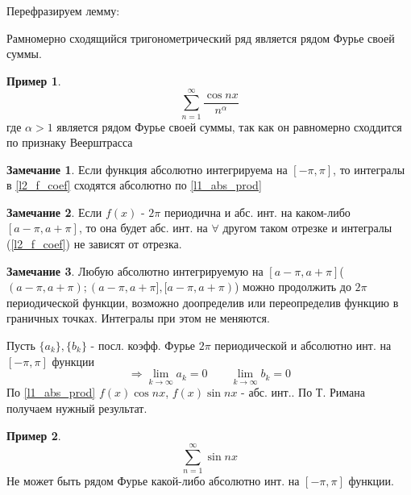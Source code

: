\documentclass{article}
\theoremstyle{definition}
\numberwithin{theorem}{section}
\numberwithin{lemma}{section}
\numberwithin{definition}{section}
\numberwithin{corollary}{section}
\newtheorem*{eg}{Пример}
\newtheorem*{remark}{Замечание}
\numberwithin{equation}{section}
\let\implies\Rightarrow
\begin{document}
Перефразируем лемму:
\begin{lemma}
  Рамномерно сходящийся тригонометрический ряд является рядом Фурье своей суммы. 
\end{lemma}
\begin{eg}
  \[
    \sum_{n=1}^{\infty}\frac{\cos nx}{n^{\alpha}}
  \]
  где $\alpha>1$ является рядом Фурье своей суммы, так  как он
  равномерно сходдится по признаку Веерштрасса
\end{eg}
\begin{remark}
  Если функция абсолютно интегрируема на $[-\pi,\pi]$, то интегралы
  в \ref{l2_f_coef} сходятся абсолютно по \ref{l1_abs_prod}
\end{remark}
\begin{remark}
  Если $f(x)$ - $2\pi$ периодична и абс. инт. на каком-либо $[a-\pi,a+\pi]$,
  то она будет абс. инт. на $\forall$ другом таком отрезке и
  интегралы (\ref{l2_f_coef}) не зависят от отрезка.
\end{remark}
\begin{remark}
  Любую абсолютно интегрируемую на $[a-\pi,a+\pi]$($(a-\pi,a+\pi);(a-\pi,a+\pi], [a-\pi,a+\pi)$)
  можно продолжить до $2\pi$ периодической функции,
  возможно доопределив или переопределив функцию в граничных точках.
  Интегралы при этом не меняются.
\end{remark}
\begin{corollary}
  Пусть $\{a_k\}, \{b_k\}$ - посл. коэфф. Фурье $2\pi$ периодической 
  и абсолютно инт. на $[-\pi,\pi]$ функции \[
    \implies \lim\limits_{k\to\infty} a_k=0 \qquad \lim\limits_{k\to\infty} b_k=0
  \]
  По \ref{l1_abs_prod} 
  $f(x)\cos nx$, $f(x) \sin nx $ - абс. инт.. По Т. Римана получаем нужный результат.
\end{corollary}
\begin{eg}
  \[
    \sum_{n=1}^{\infty}\sin nx
  \]
  Не может быть рядом Фурье какой-либо абсолютно инт. на $[-\pi,\pi]$ функции.
\end{eg}
\end{document}
